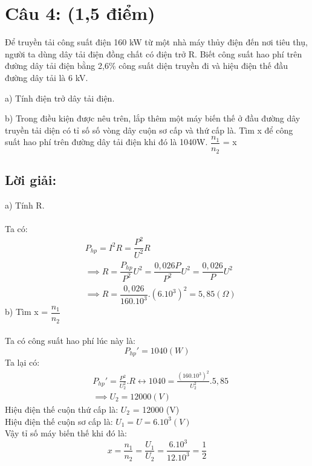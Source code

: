 \documentclass[50pt]{article}
\begin{document}
\section*{\color[HTML]{4287f5}Câu 4: (1,5 điểm)}
Để truyền tải công suất điện 160 kW từ một nhà máy thủy điện đến nơi tiêu thụ, người ta dùng dây tải điện đồng chất có điện trở R. Biết công suất hao phí trên đường dây tải điện bằng 2,6\% công suất diện truyền đi và hiệu điện thế đầu đường dây tải là 6 kV.

a) Tính điện trở dây tải điện.

b) Trong điều kiện được nêu trên, lắp thêm một máy biến thế ở đầu đường dây truyền tải diện có tỉ số số vòng dây cuộn sơ cấp và thứ cấp là. Tìm x để công suất hao phí trên đường dây tải điện khi đó là 1040W. $\dfrac{n_{1}}{n_{2}}$ = x
\subsection*{\color[HTML]{4287f5}Lời giải:}
a) Tính R.\\
\\
Ta có:
\begin{equation*}
    \begin{aligned}
        & P_{hp} = I^2R = \dfrac{P^2}{U^2}R \\
        & \implies R = \dfrac{P_{hp}}{P^2}U^2 = \dfrac{0,026P}{P^2}U^2 = \dfrac{0,026}{P}U^2 \\
        & \implies R = \dfrac{0,026}{160.10^3}.(6.10^3)^2 = 5,85 (\Omega)
    \end{aligned}
\end{equation*}
b) Tìm x = $\dfrac{n_{1}}{n_{2}}$\\
\\
Ta có công suất hao phí lúc này là:
\begin{equation*}
    P_{hp}' = 1040 (W)
\end{equation*}
Ta lại có:
\begin{equation*}
    \begin{aligned}
        & P_{hp}' = \frac{P^2}{U_{2}^2}.R \leftrightarrow 1040 = \frac{(160.10^3)^2}{U_{2}^2}.5,85\\
        & \implies U_{2} = 12000 (V)
    \end{aligned}
\end{equation*}
Hiệu điện thế cuộn thứ cấp là: $U_{2}$ = 12000 (V)\\
Hiệu điện thế cuộn sơ cấp là: $U_{1} = U = 6.10^3 (V)$\\
Vậy tỉ số máy biến thế khi đó là:
\begin{equation*}
    x = \dfrac{n_{1}}{n_{2}} = \dfrac{U_{1}}{U_{2}} = \dfrac{6.10^3}{12.10^3} = \dfrac{1}{2}
\end{equation*}
\end{document}
